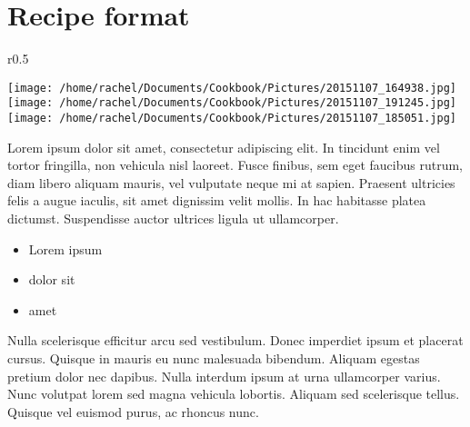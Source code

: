 \documentclass{article}
\begin{document}
\section*{\fontsize{25}{15}\selectfont Recipe format}



\begin{wrapfigure}{r}{0.5\textwidth}
\
  \begin{center}
 	\hfill\begin{minipage}{.5\textwidth}\centering
 	\vspace*{-5.5cm}
		\texttt{[image: /home/rachel/Documents/Cookbook/Pictures/20151107\_164938.jpg]}
		\\[5mm]
		\texttt{[image: /home/rachel/Documents/Cookbook/Pictures/20151107\_191245.jpg]}
		\\[5mm]
		\texttt{[image: /home/rachel/Documents/Cookbook/Pictures/20151107\_185051.jpg]}
	\end{minipage}  
	\end{center}

\end{wrapfigure}



\vspace{10mm}

Lorem ipsum dolor sit amet, consectetur adipiscing elit. In tincidunt enim vel tortor fringilla, non vehicula nisl laoreet. Fusce finibus, sem eget faucibus rutrum, diam libero aliquam mauris, vel vulputate neque mi at sapien. Praesent ultricies felis a augue iaculis, sit amet dignissim velit mollis. In hac habitasse platea dictumst. Suspendisse auctor ultrices ligula ut ullamcorper.
 
\vspace{5mm}
{\selectfont 
    \begin{itemize}[noitemsep]
    
      \item[] Lorem ipsum
      \item[] dolor sit
      \item[] amet
      
    \end{itemize}
    }
\vspace{5mm}
    
Nulla scelerisque efficitur arcu sed vestibulum. Donec imperdiet ipsum et placerat cursus. Quisque in mauris eu nunc malesuada bibendum. Aliquam egestas pretium dolor nec dapibus. Nulla interdum ipsum at urna ullamcorper varius. Nunc volutpat lorem sed magna vehicula lobortis. Aliquam sed scelerisque tellus. Quisque vel euismod purus, ac rhoncus nunc.
\end{document}
